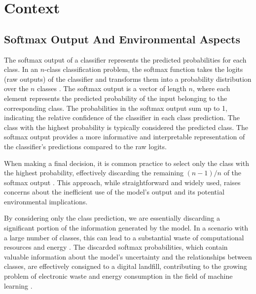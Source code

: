 
\section{Context}


\subsection{Softmax Output And Environmental Aspects}

The softmax output of a classifier represents the predicted probabilities for each class. In an $n$-class classification problem, the softmax function takes the logits (raw outputs) of the classifier and transforms them into a probability distribution over the $n$ classes \cite{goodfellow2016deep}. The softmax output is a vector of length $n$, where each element represents the predicted probability of the input belonging to the corresponding class. The probabilities in the softmax output sum up to 1, indicating the relative confidence of the classifier in each class prediction. The class with the highest probability is typically considered the predicted class. The softmax output provides a more informative and interpretable representation of the classifier's predictions compared to the raw logits.

When making a final decision, it is common practice to select only the class with the highest probability, effectively discarding the remaining $(n-1)/n$ of the softmax output \cite{gal2016uncertainty}. This approach, while straightforward and widely used, raises concerns about the inefficient use of the model's output and its potential environmental implications.

By considering only the class prediction, we are essentially discarding a significant portion of the information generated by the model. In a scenario with a large number of classes, this can lead to a substantial waste of computational resources and energy \cite{strubell2019energy}. The discarded softmax probabilities, which contain valuable information about the model's uncertainty and the relationships between classes, are effectively consigned to a digital landfill, contributing to the growing problem of electronic waste and energy consumption in the field of machine learning \cite{schwartz2020green}.

